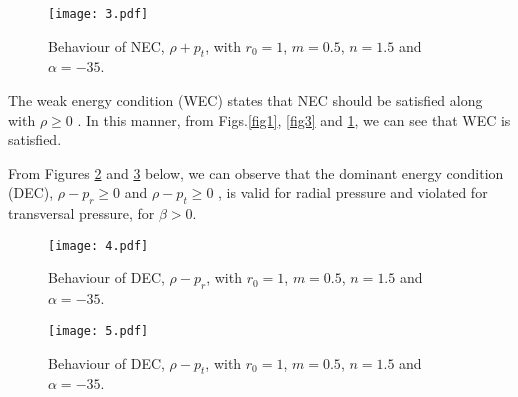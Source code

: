 \documentclass[twocolumn,showpacs,aps,amssymb,floatfix,prd,amsmath,preprintnumbers]{revtex4}
\begin{document}

\begin{figure}[h!]
\centering
\texttt{[image: 3.pdf]}
\caption{Behaviour of NEC, $\rho+p_t$, with $r_0=1$, $m=0.5$, $n=1.5$ and $\alpha=-35$.}\label{fig5}
\end{figure}


The weak energy condition (WEC) states that NEC should be satisfied along with $\rho\geq0$ \cite{visser/1995}. In this manner, from Figs.\ref{fig1}, \ref{fig3} and \ref{fig5}, we can see that WEC is satisfied.

From Figures \ref{fig7} and \ref{fig9} below, we can observe that the dominant energy condition (DEC), $\rho-p_r\geq0$ and $\rho-p_t\geq0$ \cite{visser/1995}, is valid for radial pressure and violated for transversal pressure, for $\beta>0$.

\begin{figure}[h!]
\centering
\texttt{[image: 4.pdf]}
\caption{Behaviour of DEC, $\rho-p_r$, with $r_0=1$, $m=0.5$, $n=1.5$ and $\alpha=-35$.}\label{fig7}
\end{figure}


\begin{figure}[h!]
\centering
\texttt{[image: 5.pdf]}
\caption{Behaviour of DEC, $\rho-p_t$, with $r_0=1$, $m=0.5$, $n=1.5$ and $\alpha=-35$.}\label{fig9}
\end{figure}

\end{document}
